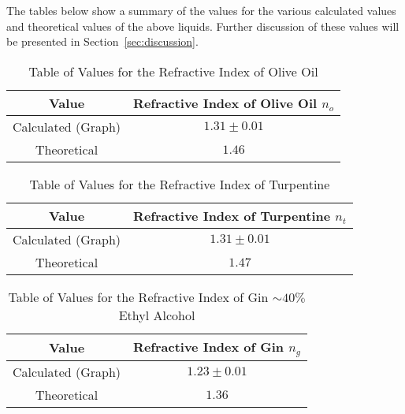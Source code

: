 \documentclass{article}
\newcommand{\secref}[2][Section~]{#1\ref{#2}}
\begin{document}
\vspace{2mm}
\noindent
The tables below show a summary of the values for the various calculated values and theoretical values of the above liquids. Further discussion of these values will be presented in \secref{sec:discussion}.

\vspace{2mm}
\begin{table*}[h]
\centering %
\caption{Table of Values for the Refractive Index of Olive Oil}
\label{tab:table-oil}
\begin{tabular}{|c|c|}
\hline
Value & Refractive Index of Olive Oil $n_o$ \\
\hline
Calculated (Graph) & $1.31\pm 0.01$  \\
\hline
Theoretical \cite{Web01} & $1.46$ \\
\hline
\end{tabular}
\end{table*}

\vspace{2mm}
\begin{table*}[h]
\centering %
\caption{Table of Values for the Refractive Index of Turpentine}
\label{tab:table-turpentine}
\begin{tabular}{|c|c|}
\hline
Value & Refractive Index of Turpentine $n_t$ \\
\hline
Calculated (Graph) & $1.31\pm 0.01$  \\
\hline
Theoretical \cite{Web01} & $1.47$ \\
\hline
\end{tabular}
\end{table*}

\vspace{2mm}
\begin{table*}[h]
\centering %
\caption{Table of Values for the Refractive Index of Gin $\sim40\%$ Ethyl Alcohol}
\label{tab:table-gin}
\begin{tabular}{|c|c|}
\hline
Value & Refractive Index of Gin $n_g$ \\
\hline
Calculated (Graph) & $1.23\pm 0.01$  \\
\hline
Theoretical \cite{Web02} & $1.36$ \\
\hline
\end{tabular}
\end{table*}
\end{document}
